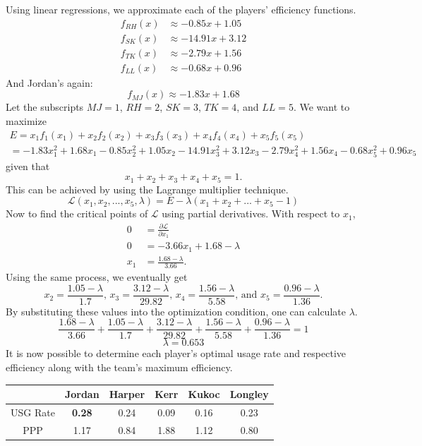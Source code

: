 \documentclass{article}
\newcommand{\Lagr}{\mathcal{L}}
\begin{document}
Using linear regressions, we approximate each of the players' efficiency functions.
\begin{equation*} 
\begin{split}
 f_{RH}(x)& \approx -0.85x+1.05 \\
 f_{SK}(x)& \approx -14.91x+3.12 \\
 f_{TK}(x)& \approx -2.79x+1.56 \\
 f_{LL}(x)& \approx -0.68x+0.96
\end{split}
\end{equation*}
And Jordan's again:
$$f_{MJ}(x) \approx -1.83x+1.68$$
Let the subscripts $MJ=1$, $RH=2$, $SK=3$, $TK=4$, and $LL=5$.
We want to maximize 
\begin{gather*}
 E=x_1f_1(x_1)+x_2f_2(x_2)+x_3f_3(x_3)+x_4f_4(x_4)+x_5f_5(x_5) \\
 =-1.83x_1^2+1.68x_1-0.85x_2^2+1.05x_2-14.91x_3^2+3.12x_3-2.79x_4^2+1.56x_4-0.68x_5^2+0.96x_5
\end{gather*}
given that $$x_1+x_2+x_3+x_4+x_5=1.$$
This can be achieved by using the Lagrange multiplier technique. $$\Lagr(x_1,x_2,...,x_5,\lambda)=E-\lambda(x_1+x_2+...+x_5-1)$$
Now to find the critical points of $\Lagr$ using partial derivatives. With respect to $x_1$,
\begin{equation*}
    \begin{split}
        0&=\frac{\partial \Lagr}{\partial x_1} \\
        0&=-3.66x_1+1.68-\lambda \\
        x_1&=\frac{1.68-\lambda}{3.66}.
    \end{split}
\end{equation*}
Using the same process, we eventually get $$x_2=\frac{1.05-\lambda}{1.7}\text{, } x_3=\frac{3.12-\lambda}{29.82}\text{, } x_4=\frac{1.56-\lambda}{5.58}\text{, and } x_5=\frac{0.96-\lambda}{1.36}.$$
By substituting these values into the optimization condition, one can calculate $\lambda$.
$$\frac{1.68-\lambda}{3.66}+\frac{1.05-\lambda}{1.7}+\frac{3.12-\lambda}{29.82}+\frac{1.56-\lambda}{5.58}+\frac{0.96-\lambda}{1.36}=1$$
$$\lambda = 0.653$$
It is now possible to determine each player's optimal usage rate and respective efficiency along with the team's maximum efficiency.
\begin{table}[h]
 \centering
 \begin{tabular}{|c||c c c c c|} 
 \hline
  & Jordan & Harper & Kerr & Kukoc & Longley \\ [0.5ex] 
 \hline\hline
 USG Rate & \textbf{0.28} & 0.24 & 0.09 & 0.16 & 0.23 \\ [1ex] 
 \hline
 PPP & 1.17 & 0.84 & 1.88 & 1.12 & 0.80 \\ [1ex] 
 \hline
\end{tabular}
\end{table}
\end{document}
